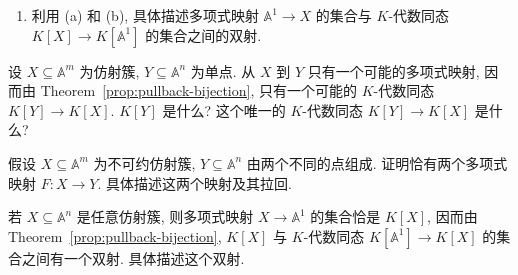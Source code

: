 \begin{BookExercises}
\begin{enumerate}[label=(\alph*)]
\[        \]
        它在生成元上的定义为
        \[
          \begin{aligned}
            \phi([x])&=f_{1}(w)\\
            \phi([y])&=f_{2}(w)\\
            \phi([z])&=f_{3}(w)?
          \end{aligned}
        \]
        给出满足和不满足该条件的 $f_{1},f_{2},f_{3}\in K[w]$ 各一个具体例子.
      \item 利用 (a) 和 (b), 具体描述多项式映射 $\mathbb{A}^{1}\to X$ 的集合与 $K$-代数同态 $K[X]\to K[\mathbb{A}^{1}]$ 的集合之间的双射.
    \end{enumerate}
  \item\label{ex:pullback-to-a-point} 设 $X\subseteq\mathbb{A}^{m}$ 为仿射簇, $Y\subseteq\mathbb{A}^{n}$ 为单点. 从 $X$ 到 $Y$ 只有一个可能的多项式映射, 因而由 Theorem~\ref{prop:pullback-bijection}, 只有一个可能的 $K$-代数同态 $K[Y]\to K[X]$. $K[Y]$ 是什么? 这个唯一的 $K$-代数同态 $K[Y]\to K[X]$ 是什么?
  \item\label{ex:pullback-from-irreducible-to-two-points} 假设 $X\subseteq\mathbb{A}^{m}$ 为不可约仿射簇, $Y\subseteq\mathbb{A}^{n}$ 由两个不同的点组成. 证明恰有两个多项式映射 $F:X\to Y$. 具体描述这两个映射及其拉回.
  \item\label{ex:pullbacks-of-polynomial-functions} 若 $X\subseteq\mathbb{A}^{n}$ 是任意仿射簇, 则多项式映射 $X\to\mathbb{A}^{1}$ 的集合恰是 $K[X]$, 因而由 Theorem~\ref{prop:pullback-bijection}, $K[X]$ 与 $K$-代数同态 $K[\mathbb{A}^{1}]\to K[X]$ 的集合之间有一个双射. 具体描述这个双射.
\end{BookExercises}
